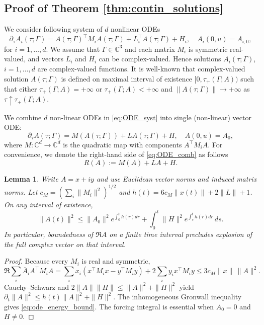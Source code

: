 \documentclass[11pt,a4paper] {article}
\newtheorem{lemma}{Lemma}[section]
\begin{document}
\subsection{Proof of Theorem \ref{thm:contin_solutions}}\label{app:contin_solutions}  
We consider following system of $d$ nonlinear ODEs
\begin{equation}\label{eq:ODE_syst}
\partial_{\tau} A_i(\tau; \Gamma)=A(\tau; \Gamma)^\top M_iA(\tau; \Gamma)+L_i^\top A(\tau; \Gamma)+H_i,\quad A_i(0,u)=A_{i,0},
\end{equation}
for $i=1,\ldots,d$. We assume that $\Gamma\in \mathbb{C}^3$ and each matrix $M_i$ is symmetric real-valued, and vectors $L_i$ and $H_i$ can be complex-valued. Hence solutions $A_i(\tau; \Gamma)$, $i=1,\ldots, d$ are complex-valued functions. It is well-known that complex-valued solution $A(\tau; \Gamma)$ is defined on maximal interval of existence $[0,\tau_+(\Gamma; A))$ such that either $\tau_+(\Gamma; A)=+\infty$ or $\tau_+(\Gamma; A)<+\infty$ and $\|A(\tau; \Gamma)\|\to +\infty$ as $\tau\uparrow \tau_+(\Gamma; A)$. 

We combine $d$ non-linear ODEs in \eqref{eq:ODE_syst} into single (non-linear) vector ODE:
\begin{equation}\label{eq:ODE_comb}
\partial_{\tau} A(\tau; \Gamma)=M(A(\tau; \Gamma))+LA(\tau; \Gamma)+H,\quad A(0,u)=A_0,
\end{equation}
where $M:\mathbb C^d\to\mathbb C^d$ is the quadratic map with components $A^\top M_iA$. For convenience, we denote the right-hand side of \eqref{eq:ODE_comb} as follows
\begin{equation}
R(A):=M(A)+LA+H.
\end{equation} 


\begin{lemma}\label{lemm:bound2}
Write $A=x+iy$ and use Euclidean vector norms and induced matrix norms. Let
$c_M=(\sum_i\|M_i\|^2)^{1/2}$ and
$h(t)=6c_M\|x(t)\|+2\|L\|+1$. On any interval of existence,
\begin{equation}\label{eq:ode_energy_bound}
\|A(t)\|^2\leq \|A_0\|^2e^{\int_0^t h(r)dr}
+\int_0^t\|H\|^2e^{\int_s^t h(r)dr}\,ds.
\end{equation}
In particular, boundedness of $\Re A$ on a finite time interval precludes
explosion of the full complex vector on that interval.
\end{lemma}
\begin{proof}
Because every $M_i$ is real and symmetric,
\begin{equation*}
\Re\sum_i\overline A_i A^\top M_iA
=\sum_i x_i(x^\top M_ix-y^\top M_iy)
 +2\sum_i y_ix^\top M_iy
\leq3c_M\|x\|\,\|A\|^2.
\end{equation*}
Cauchy--Schwarz and $2\|A\|\|H\|\leq\|A\|^2+\|H\|^2$ yield
$\partial_t\|A\|^2\leq h(t)\|A\|^2+\|H\|^2$.
The inhomogeneous Gronwall inequality gives \eqref{eq:ode_energy_bound}.
The forcing integral is essential when $A_0=0$ and $H\ne0$.
\end{proof}
\end{document}
